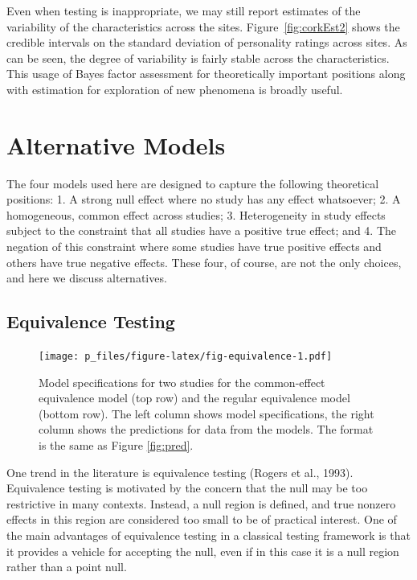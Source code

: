 \documentclass[english,man]{apa6}
\theoremstyle{definition}
\theoremstyle{definition}
\theoremstyle{remark}
\begin{document}
Even when testing is inappropriate, we may still report estimates of the
variability of the characteristics across the sites.
Figure~\ref{fig:corkEst2} shows the credible intervals on the standard
deviation of personality ratings across sites. As can be seen, the
degree of variability is fairly stable across the characteristics. This
usage of Bayes factor assessment for theoretically important positions
along with estimation for exploration of new phenomena is broadly
useful.

\section{Alternative Models}\label{alternative-models}

The four models used here are designed to capture the following
theoretical positions: 1. A strong null effect where no study has any
effect whatsoever; 2. A homogeneous, common effect across studies; 3.
Heterogeneity in study effects subject to the constraint that all
studies have a positive true effect; and 4. The negation of this
constraint where some studies have true positive effects and others have
true negative effects. These four, of course, are not the only choices,
and here we discuss alternatives.

\subsection{Equivalence Testing}\label{equivalence-testing}

\begin{figure}[htbp]
\centering
\texttt{[image: p\_files/figure-latex/fig-equivalence-1.pdf]}
\caption{\label{fig:fig-equivalence}Model specifications for two studies for
the common-effect equivalence model (top row) and the regular
equivalence model (bottom row). The left column shows model
specifications, the right column shows the predictions for data from the
models. The format is the same as Figure \ref{fig:pred}.}
\end{figure}

One trend in the literature is equivalence testing (Rogers et al.,
1993). Equivalence testing is motivated by the concern that the null may
be too restrictive in many contexts. Instead, a null region is defined,
and true nonzero effects in this region are considered too small to be
of practical interest. One of the main advantages of equivalence testing
in a classical testing framework is that it provides a vehicle for
accepting the null, even if in this case it is a null region rather than
a point null.
\end{document}
